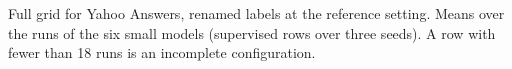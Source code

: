 \begin{table}[t]
  \centering
  \footnotesize
  
  \caption{Full grid for Yahoo Answers, renamed labels at the reference setting. Means over the runs of the six small models (supervised rows over three seeds). A row with fewer than 18 runs is an incomplete configuration.}
  \label{tab:grid_yahoo_relabel}
\end{table}
